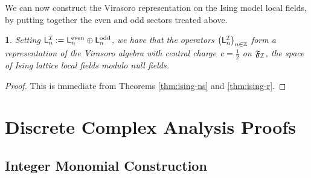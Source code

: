 \documentclass[12pt,oneside,english]{amsart}
\numberwithin{equation}{section}
\numberwithin{figure}{section}
\theoremstyle{plain}
\newtheorem{thm}{\protect\theoremname}
\theoremstyle{plain}
\theoremstyle{plain}
\theoremstyle{plain}
\theoremstyle{remark}
\theoremstyle{definition}
\theoremstyle{plain}
\theoremstyle{plain}
\numberwithin{thm}{section}
\providecommand{\theoremname}{Theorem}
\providecommand{\theoremname}{Theorem}
\providecommand{\theoremname}{Theorem}
\providecommand{\theoremname}{Theorem}
\begin{document}
We can now construct
the Virasoro representation on the Ising model local 
fields, by putting together the even and odd sectors treated above.
\begin{thm}
\label{thm:ising}Setting $\mathsf{L}_{n}^{\mathcal{I}} := 
\mathsf{L}_{n}^{\mathrm{even}} \oplus \mathsf{L}_{n}^{\mathrm{odd}}$,
we have that the operators
$\left(\mathsf{L}_{n}^{\mathcal{I}}\right)_{n \in \mathbb{Z}}$ form a representation
of the Virasoro algebra with central charge~${c=\frac{1}{2}}$ on 
$\mathfrak{F}_{\mathcal{I}}$,
the space of Ising lattice local fields modulo null fields. 
\end{thm}
\begin{proof}
This is immediate from Theorems \ref{thm:ising-ns} and \ref{thm:ising-r}.
\end{proof}

\section{\label{sec:discrete-complex-analysis-proofs}Discrete Complex Analysis
Proofs}

\subsection{Integer Monomial Construction}
\end{document}
